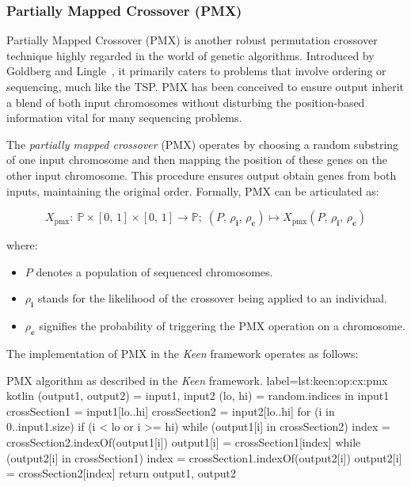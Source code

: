 \subsubsection{Partially Mapped Crossover (PMX)}
\label{sec:keen:op:cx:partially_mapped}
  Partially Mapped Crossover (PMX) is another robust permutation crossover 
  technique highly regarded in the world of genetic algorithms. Introduced by 
  Goldberg and Lingle~\autocite{goldbergAllelesLociTraveling1985}, it primarily 
  caters to problems that involve ordering or sequencing, much like the TSP. PMX 
  has been conceived to ensure output inherit a blend of both input 
  chromosomes without disturbing the position-based information vital for many 
  sequencing problems.

  \begin{definition}
    The \textit{partially mapped crossover} (PMX) operates by choosing a random 
    substring of one input chromosome and then mapping the position of these 
    genes on the other input chromosome. This procedure ensures output 
    obtain genes from both inputs, maintaining the original order. Formally, 
    PMX can be articulated as:

    \begin{equation}
      X_\mathrm{pmx} :\: 
        \mathbb{P} \times [0,\, 1] \times [0,\, 1] \rightarrow \mathbb{P};\;
        (P,\, \rho_\mathbf{i},\, \rho_\mathbf{c})
          \mapsto X_\mathrm{pmx}(P,\, \rho_\mathbf{i},\, \rho_\mathbf{c})
    \end{equation}

    where:

    \begin{itemize}
      \item \(P\) denotes a population of sequenced chromosomes.
      \item \(\rho_\mathbf{i}\) stands for the likelihood of the crossover being applied to an individual.
      \item \(\rho_\mathbf{c}\) signifies the probability of triggering the PMX operation on a chromosome.
    \end{itemize}
  \end{definition}

  The implementation of PMX in the \textit{Keen} framework operates as follows:

  \begin{code}{
      PMX algorithm as described in the \textit{Keen} framework.
  }{
      label={lst:keen:op:cx:pmx}
  }{kotlin}
    (output1, output2) = input1, input2
    (lo, hi) = random.indices in input1
    crossSection1 = input1[lo..hi]
    crossSection2 = input2[lo..hi]
    for (i in 0..input1.size) {
        if (i < lo or i >= hi) {
            while (output1[i] in crossSection2) {
                index = crossSection2.indexOf(output1[i])
                output1[i] = crossSection1[index]
            }
            while (output2[i] in crossSection1) {
                index = crossSection1.indexOf(output2[i])
                output2[i] = crossSection2[index]
            }
        }
    }
    return output1, output2
  \end{code}

